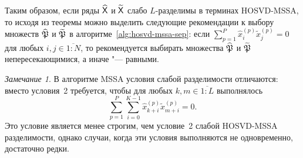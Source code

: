\documentclass[specialist,
    substylefile = spbu_report.rtx,
    subf,href,colorlinks=true, 12pt]{disser}
\theoremstyle{plain}
\theoremstyle{definition}
\theoremstyle{remark}
\newtheorem*{remark}{Замечание}
\begin{document}
    Таким образом, если ряды $\widehat{\mathsf{X}}$ и $\widetilde{\mathsf{X}}$ слабо $L$-разделимы
    в терминах HOSVD-MSSA, то исходя из теоремы можно выделить следующие рекомендации 
    к выбору множеств $\widehat{\mathfrak{P}}$ и $\widetilde{\mathfrak{P}}$ в алгоритме~\ref{alg:hosvd-mssa-sep}:
    если $\sum_{p=1}^P \hat{x}_i^{(p)}\tilde{x}_j^{(p)} = 0$ для любых $i, j \in \overline{1:N}$,
    то рекомендуется выбирать множества $\widehat{\mathfrak{P}}$ и $\widetilde{\mathfrak{P}}$
    непересекающимися, а иначе "--- равными.
    
    \begin{remark}
        В алгоритме MSSA условия слабой разделимости отличаются: вместо условия~2 требуется, чтобы для любых
        $k, m \in \overline{1:L}$ выполнялось
        \[
            \sum_{p=1}^{P} \sum_{i=0}^{K-1} \hat{x}_{k+i}^{(p)} \tilde{x}_{m+i}^{(p)} = 0.
        \]
        Это условие является менее строгим, чем условие~2 слабой HOSVD-MSSA разделимости, однако случаи,
        когда эти условия выполняются не одновременно, достаточно редки.
    \end{remark}
    
    
\end{document}
